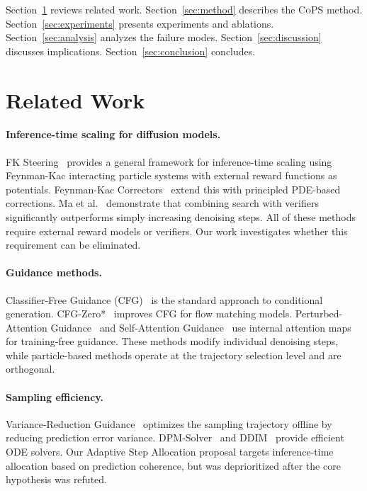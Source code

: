 \documentclass{article}
\newcommand{\cops}{\textsc{CoPS}}
\begin{document}
Section~\ref{sec:related} reviews related work. Section~\ref{sec:method} describes the \cops{} method. Section~\ref{sec:experiments} presents experiments and ablations. Section~\ref{sec:analysis} analyzes the failure modes. Section~\ref{sec:discussion} discusses implications. Section~\ref{sec:conclusion} concludes.

\section{Related Work}
\label{sec:related}

\paragraph{Inference-time scaling for diffusion models.}
FK Steering~\citep{singhal2025fk} provides a general framework for inference-time scaling using Feynman-Kac interacting particle systems with external reward functions as potentials. Feynman-Kac Correctors~\citep{skreta2025fkc} extend this with principled PDE-based corrections. Ma et al.~\citep{ma2025scaling} demonstrate that combining search with verifiers significantly outperforms simply increasing denoising steps. All of these methods require external reward models or verifiers. Our work investigates whether this requirement can be eliminated.

\paragraph{Guidance methods.}
Classifier-Free Guidance (CFG)~\citep{ho2022cfg} is the standard approach to conditional generation. CFG-Zero*~\citep{fan2025cfgzero} improves CFG for flow matching models. Perturbed-Attention Guidance~\citep{ahn2024pag} and Self-Attention Guidance~\citep{hong2023sag} use internal attention maps for training-free guidance. These methods modify individual denoising steps, while particle-based methods operate at the trajectory selection level and are orthogonal.

\paragraph{Sampling efficiency.}
Variance-Reduction Guidance~\citep{xu2025vrg} optimizes the sampling trajectory offline by reducing prediction error variance. DPM-Solver~\citep{lu2022dpm} and DDIM~\citep{song2021ddim} provide efficient ODE solvers. Our Adaptive Step Allocation proposal targets inference-time allocation based on prediction coherence, but was deprioritized after the core hypothesis was refuted.
\end{document}
